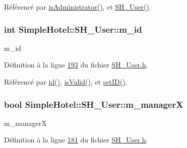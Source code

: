 Référencé par \hyperlink{classSimpleHotel_1_1SH__User_aad4b9071828b2aedac8ad964c9b4e987}{is\-Administrator()}, et \hyperlink{classSimpleHotel_1_1SH__User_a17ba6e42386d48d6463cfceb92c1640c}{S\-H\-\_\-\-User()}.

\hypertarget{classSimpleHotel_1_1SH__User_a499824b11b5dff45768faa5bc02cdd54}{
\subsubsection[{m\-\_\-id}]{\setlength{\rightskip}{0pt plus 5cm}int Simple\-Hotel\-::\-S\-H\-\_\-\-User\-::m\-\_\-id\hspace{0.3cm}{\ttfamily [private]}}}\label{classSimpleHotel_1_1SH__User_a499824b11b5dff45768faa5bc02cdd54}


m\-\_\-id 



Définition à la ligne \hyperlink{SH__User_8h_source_l00193}{193} du fichier \hyperlink{SH__User_8h_source}{S\-H\-\_\-\-User.\-h}.



Référencé par \hyperlink{classSimpleHotel_1_1SH__User_ad0e5342ff3c71bde3443c4379e25031c}{id()}, \hyperlink{classSimpleHotel_1_1SH__User_a8b60e67bc474ee97367f36d0278721ca}{is\-Valid()}, et \hyperlink{classSimpleHotel_1_1SH__User_abb87bb91767d7eb171b2df58e6973f8b}{set\-I\-D()}.

\hypertarget{classSimpleHotel_1_1SH__User_a6b30ee33901dceae3148c79edbbc3f6e}{
\subsubsection[{m\-\_\-manager\-X}]{\setlength{\rightskip}{0pt plus 5cm}bool Simple\-Hotel\-::\-S\-H\-\_\-\-User\-::m\-\_\-manager\-X\hspace{0.3cm}{\ttfamily [private]}}}\label{classSimpleHotel_1_1SH__User_a6b30ee33901dceae3148c79edbbc3f6e}


m\-\_\-manager\-X 



Définition à la ligne \hyperlink{SH__User_8h_source_l00181}{181} du fichier \hyperlink{SH__User_8h_source}{S\-H\-\_\-\-User.\-h}.



